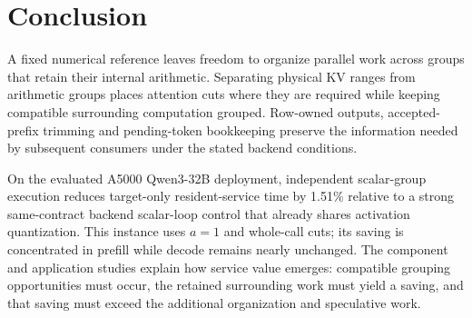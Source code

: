 \section{Conclusion}
A fixed numerical reference leaves freedom to organize parallel work across groups that retain their internal arithmetic. Separating physical KV ranges from arithmetic groups places attention cuts where they are required while keeping compatible surrounding computation grouped. Row-owned outputs, accepted-prefix trimming and pending-token bookkeeping preserve the information needed by subsequent consumers under the stated backend conditions.

On the evaluated A5000 Qwen3-32B deployment, independent scalar-group execution reduces target-only resident-service time by 1.51\% relative to a strong same-contract backend scalar-loop control that already shares activation quantization. This instance uses $a=1$ and whole-call cuts; its saving is concentrated in prefill while decode remains nearly unchanged. The component and application studies explain how service value emerges: compatible grouping opportunities must occur, the retained surrounding work must yield a saving, and that saving must exceed the additional organization and speculative work.

